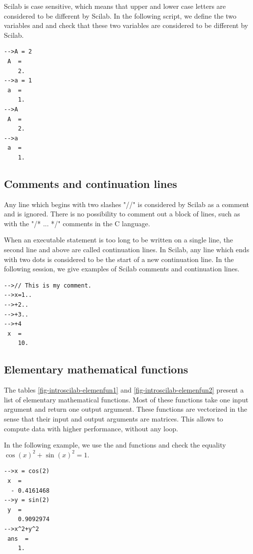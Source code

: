Scilab is case sensitive, which means that upper and lower case letters are 
considered to be different by Scilab.
In the following script, we define the two variables 
and  and check that these two variables are considered 
to be different by Scilab.
\lstset{language=scilabscript}
\begin{lstlisting}
-->A = 2
 A  =
    2.  
-->a = 1
 a  =
    1.  
-->A
 A  =
    2.  
-->a
 a  =
    1.  
\end{lstlisting}

\subsection{Comments and continuation lines}

\index{\scifun{//}}
Any line which begins with two slashes "//" is considered 
by Scilab as a comment and is ignored. There is no possibility 
to comment out a block of lines, such as with the "/* ... */" comments
in the C language.

When an executable statement is too long to be written on a single line,
the second line and above are called continuation lines.
In Scilab, any line which ends with two dots is considered
to be the start of a new continuation line. 
In the following session, we give examples of Scilab comments
and continuation lines.
\lstset{language=scilabscript}
\begin{lstlisting}
-->// This is my comment.
-->x=1..
-->+2..
-->+3..
-->+4
 x  =
    10.  
\end{lstlisting}

\subsection{Elementary mathematical functions}

The tables \ref{fig-introscilab-elemenfun1} and \ref{fig-introscilab-elemenfun2} 
present a list of elementary mathematical functions.
Most of these functions take one input argument and return one output argument.
These functions are vectorized in the sense that their input and output arguments 
are matrices. This allows to compute data with higher performance, without 
any loop.

In the following example, we use the  and  functions and 
check the equality $\cos(x)^2+\sin(x)^2=1$.
\lstset{language=scilabscript}
\begin{lstlisting}
-->x = cos(2)
 x  =
  - 0.4161468  
-->y = sin(2)
 y  =
    0.9092974  
-->x^2+y^2
 ans  =
    1.  
\end{lstlisting}


